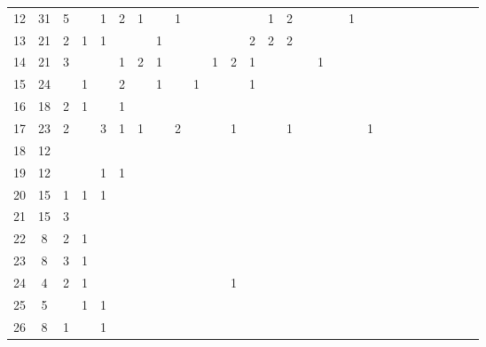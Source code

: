 \documentclass{article}
\begin{document}
\begin{table}[h]
{\begin{tabular}{|c|c|
c|c|c|c|c|c|c|c|c|c|c|c|c|c|c|c|c|c|c|c|c|c|c|c|c|c|}
12  & 31 & 5 &  & 1 & 2 & 1 &  & 1 &  &  &  &  & 1 & 2 &  &  &  & 1 &  &  &  &  &  &  &  &  & \\

13  & 21 & 2 & 1 & 1 &  &  & 1 &  &  &  &  & 2 & 2 & 2 &  &  &  &  &  &  &  &  &  &  &  &  & \\

14  & 21 & 3 &  &  & 1 & 2 & 1 &  &  & 1 & 2 & 1 &  &  &  & 1 &  &  &  &  &  &  &  &  &  &  & \\

15  & 24 &  & 1 &  & 2 &  & 1 &  & 1 &  &  & 1 &  &  &  &  &  &  &  &  &  &  &  &  &  &  & \\

16  & 18 & 2 & 1 &  & 1 &  &  &  &  &  &  &  &  &  &  &  &  &  &  &  &  &  &  &  &  &  & \\

17  & 23 & 2 &  & 3 & 1 & 1 &  & 2 &  &  & 1 &  &  & 1 &  &  &  &  & 1 &  &  &  &  &  &  &  & \\

18  & 12 &  &  &  &  &  &  &  &  &  &  &  &  &  &  &  &  &  &  &  &  &  &  &  &  &  & \\

19  & 12 &  &  & 1 & 1 &  &  &  &  &  &  &  &  &  &  &  &  &  &  &  &  &  &  &  &  &  & \\

20  & 15 & 1 & 1 & 1 &  &  &  &  &  &  &  &  &  &  &  &  &  &  &  &  &  &  &  &  &  &  & \\

21  & 15 & 3 &  &  &  &  &  &  &  &  &  &  &  &  &  &  &  &  &  &  &  &  &  &  &  &  & \\

22  & 8 & 2 & 1 &  &  &  &  &  &  &  &  &  &  &  &  &  &  &  &  &  &  &  &  &  &  &  & \\

23  & 8 & 3 & 1 &  &  &  &  &  &  &  &  &  &  &  &  &  &  &  &  &  &  &  &  &  &  &  & \\

24  & 4 & 2 & 1 &  &  &  &  &  &  &  & 1 &  &  &  &  &  &  &  &  &  &  &  &  &  &  &  & \\

25  & 5 &  & 1 & 1 &  &  &  &  &  &  &  &  &  &  &  &  &  &  &  &  &  &  &  &  &  &  & \\

26  & 8 & 1 &  & 1 &  &  &  &  &  &  &  &  &  &  &  &  &  &  &  &  &  &  &  &  &  &  & \\


\end{tabular}}
\end{table}
\end{document}

